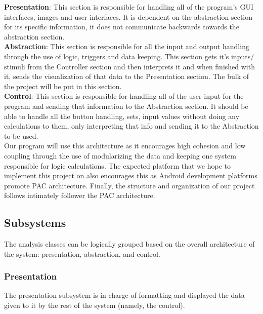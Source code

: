 \documentclass[]{article}
\begin{document}
\textbf{Presentation}: This section is responsible for handling all of the program’s
GUI interfaces, images and user interfaces. It is dependent on the abstraction section
for its specific information, it does not communicate backwards towards the abstraction section. \\

\textbf{Abstraction}: This section is responsible for all the input and output
handling through the use of logic, triggers and data keeping. This section gets it’s
inputs/ stimuli from the Controller section and then interprets it and when finished
with it, sends the visualization of that data to the Presentation section. The bulk
of the project will be put in this section. \\

\textbf{Control}: This section is responsible for handling all of the user input
for the program and sending that information to the Abstraction section. It should
be able to handle all the button handling, sets, input values without doing any
calculations to them, only interpreting that info and sending it to the Abstraction to be used. \\

Our program will use this architecture as it encourages high cohesion and low coupling
through the use of modularizing the data and keeping one system responsible for logic calculations.
The expected platform that we hope to implement this project on also encourages this as
Android development platforms promote PAC architecture. Finally, the structure and
organization of our project follows intimately follower the PAC architecture.


\subsection{Subsystems}
\label{sub:subsystems}

The analysis classes can be logically grouped based on the overall architecture
of the system: presentation, abstraction, and control.

\subsubsection{Presentation}

The presentation subsystem is in charge of formatting and displayed the data given
to it by the rest of the system (namely, the control).
\end{document}
